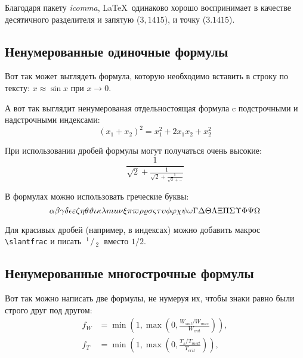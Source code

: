 Благодаря пакету \textit{icomma}, \LaTeX~одинаково хорошо воспринимает в качестве десятичного разделителя и запятую ($3,1415$), и точку ($3.1415$).

\subsection{Ненумерованные одиночные формулы} \label{subsect1_3_1}

Вот так может выглядеть формула, которую необходимо вставить в строку по тексту: $x \approx \sin x$ при $x \to 0$.

А вот так выглядит ненумерованая отдельностоящая формула c подстрочными и надстрочными индексами:
\[
(x_1+x_2)^2 = x_1^2 + 2 x_1 x_2 + x_2^2
\]

При использовании дробей формулы могут получаться очень высокие:
\[
  \frac{1}{\sqrt{2}+
  \displaystyle\frac{1}{\sqrt{2}+
  \displaystyle\frac{1}{\sqrt{2}+\cdots}}}
\]

В формулах можно использовать греческие буквы:
\[
\alpha\beta\gamma\delta\epsilon\varepsilon\zeta\eta\theta\vartheta\iota\kappa\lambda\\mu\nu\xi\pi\varpi\rho\varrho\sigma\varsigma\tau\upsilon\phi\varphi\chi\psi\omega\Gamma\Delta\Theta\Lambda\Xi\Pi\Sigma\Upsilon\Phi\Psi\Omega
\]

\def\slantfrac#1#2{ \hspace{3pt}\!^{#1}\!\!\hspace{1pt}/
  \hspace{2pt}\!\!_{#2}\!\hspace{3pt}
} %
Для красивых дробей (например, в индексах) можно добавить макрос
\verb+\slantfrac+ и писать $\slantfrac{1}{2}$ вместо $1/2$.

\subsection{Ненумерованные многострочные формулы} \label{subsect1_3_2}

Вот так можно написать две формулы, не нумеруя их, чтобы знаки равно были строго друг под другом:
\begin{align}
  f_W & =  \min \left( 1, \max \left( 0, \frac{W_{soil} / W_{max}}{W_{crit}} \right)  \right), \nonumber \\
  f_T & =  \min \left( 1, \max \left( 0, \frac{T_s / T_{melt}}{T_{crit}} \right)  \right), \nonumber
\end{align}

